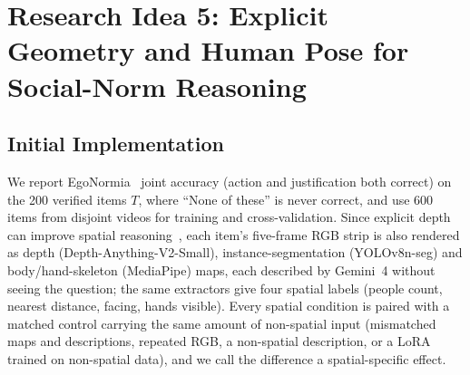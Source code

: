 \section{Research Idea 5: Explicit Geometry and Human Pose for Social-Norm Reasoning}
\subsection{Initial Implementation}
\label{sec:idea5-impl}

We report EgoNormia~\citep{rezaei2025egonormia} joint accuracy (action and justification both correct) on the 200 verified items $T$, where ``None of these'' is never correct, and use 600 items from disjoint videos for training and cross-validation. Since explicit depth can improve spatial reasoning~\citep{cheng2024spatialrgpt}, each item's five-frame RGB strip is also rendered as depth (Depth-Anything-V2-Small), instance-segmentation (YOLOv8n-seg) and body/hand-skeleton (MediaPipe) maps, each described by Gemini~4 without seeing the question; the same extractors give four spatial labels (people count, nearest distance, facing, hands visible). Every spatial condition is paired with a matched control carrying the same amount of non-spatial input (mismatched maps and descriptions, repeated RGB, a non-spatial description, or a LoRA trained on non-spatial data), and we call the difference a spatial-specific effect.

